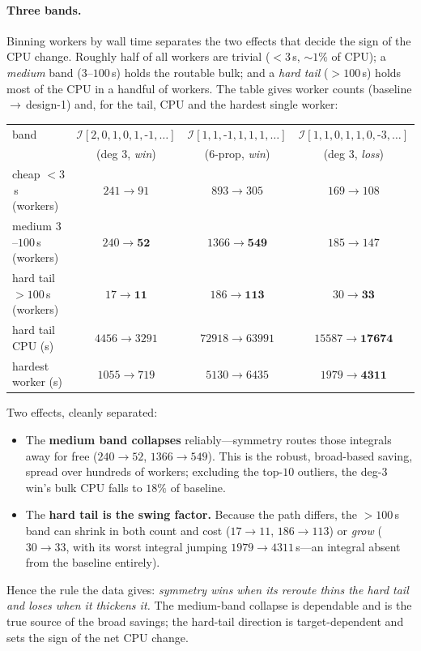 \documentclass[11pt]{article}
\newcommand{\I}[1]{\mathcal{I}[#1]}
\begin{document}
\paragraph{Three bands.} Binning workers by wall time separates the two effects that
decide the sign of the CPU change. Roughly half of all workers are trivial ($<3$\,s,
$\sim1\%$ of CPU); a \emph{medium} band ($3$--$100$\,s) holds the routable bulk; and a
\emph{hard tail} ($>100$\,s) holds most of the CPU in a handful of workers. The table
gives worker counts (baseline\,$\to$\,design-1) and, for the tail, CPU and the hardest
single worker:
\begin{center}
\footnotesize
\begin{tabular}{lccc}
\toprule
band & $\I{2,0,1,0,1,\text{-}1,\dots}$ & $\I{1,1,\text{-}1,1,1,1,\dots}$ & $\I{1,1,0,1,1,0,\text{-}3,\dots}$ \\
     & (deg 3, \emph{win}) & (6-prop, \emph{win}) & (deg 3, \emph{loss}) \\
\midrule
cheap $<3$\,s (workers)        & $241\to91$   & $893\to305$    & $169\to108$ \\
medium $3$--$100$\,s (workers) & $240\to\mathbf{52}$ & $1366\to\mathbf{549}$ & $185\to147$ \\
hard tail $>100$\,s (workers)  & $17\to\mathbf{11}$  & $186\to\mathbf{113}$  & $30\to\mathbf{33}$ \\
hard tail CPU (s)              & $4456\to3291$ & $72918\to63991$ & $15587\to\mathbf{17674}$ \\
hardest worker (s)             & $1055\to719$  & $5130\to6435$   & $1979\to\mathbf{4311}$ \\
\bottomrule
\end{tabular}
\end{center}

Two effects, cleanly separated:
\begin{itemize}
\item The \textbf{medium band collapses} reliably---symmetry routes those integrals
      away for free ($240\to52$, $1366\to549$). This is the robust, broad-based saving,
      spread over hundreds of workers; excluding the top-$10$ outliers, the deg-3 win's
      bulk CPU falls to $18\%$ of baseline.
\item The \textbf{hard tail is the swing factor.} Because the path differs, the
      $>100$\,s band can shrink in both count and cost ($17\to11$, $186\to113$) or
      \emph{grow} ($30\to33$, with its worst integral jumping $1979\to4311$\,s---an
      integral absent from the baseline entirely).
\end{itemize}
Hence the rule the data gives: \emph{symmetry wins when its reroute thins the hard tail
and loses when it thickens it.} The medium-band collapse is dependable and is the true
source of the broad savings; the hard-tail direction is target-dependent and sets the
sign of the net CPU change.
\end{document}
